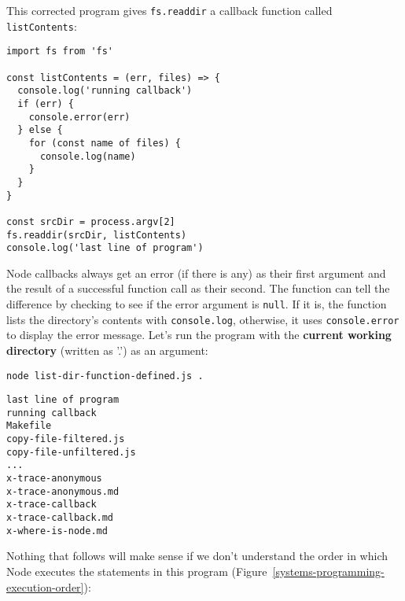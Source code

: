 \documentclass[krantzl]{krantz}
\newcommand{\figref}[1]{Figure~\ref{#1}}
\newcommand{\glossref}[1]{\textbf{#1}}
\begin{document}
This corrected program gives \texttt{fs.readdir} a callback function called \texttt{listContents}:


\begin{lstlisting}[frame=single,frameround=tttt]
import fs from 'fs'

const listContents = (err, files) => {
  console.log('running callback')
  if (err) {
    console.error(err)
  } else {
    for (const name of files) {
      console.log(name)
    }
  }
}

const srcDir = process.argv[2]
fs.readdir(srcDir, listContents)
console.log('last line of program')
\end{lstlisting}



\noindent Node callbacks
always get an error (if there is any) as their first argument
and the result of a successful function call as their second.
The function can tell the difference by checking to see if the error argument is \texttt{null}.
If it is, the function lists the directory's contents with \texttt{console.log},
otherwise, it uses \texttt{console.error} to display the error message.
Let's run the program with the \glossref{current working directory}
(written as '.')
as an argument:


\begin{lstlisting}[frame=single,frameround=tttt]
node list-dir-function-defined.js .
\end{lstlisting}



\begin{lstlisting}[frame=single,frameround=tttt]
last line of program
running callback
Makefile
copy-file-filtered.js
copy-file-unfiltered.js
...
x-trace-anonymous
x-trace-anonymous.md
x-trace-callback
x-trace-callback.md
x-where-is-node.md
\end{lstlisting}



Nothing that follows will make sense if we don't understand
the order in which Node executes the statements in this program
(\figref{systems-programming-execution-order}):
\end{document}
